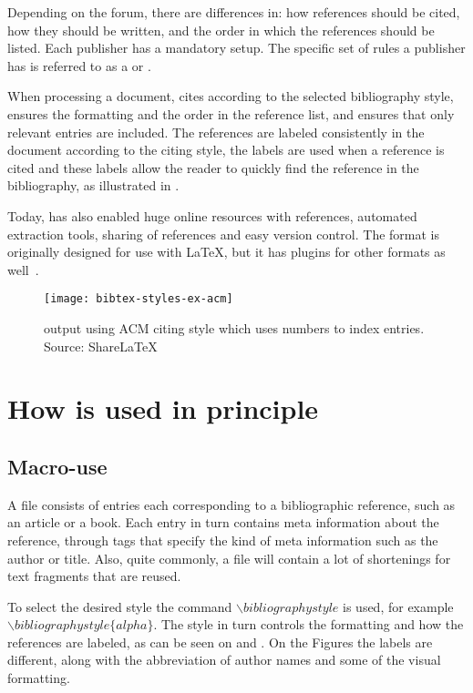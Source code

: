 Depending on the forum, there are differences in: how references
should be cited, how they should be written, and the order in which
the references should be listed.  Each publisher has a mandatory
setup.  The specific set of rules a publisher has is referred to as a
 or .

When processing a document, {\bibtex} cites according to the selected
bibliography style, ensures the formatting and the order in the
reference list, and ensures that only relevant entries are included.
The references are labeled consistently in the document according to
the citing style, the labels are used when a reference is cited and
these labels allow the reader to quickly find the reference in the
bibliography, as illustrated in .

Today, {\bibtex} has also enabled huge online resources with
references, automated extraction tools, sharing of references and easy
version control.  The {\bibtex} format is originally designed for use
with {\LaTeX}, but it has plugins for other formats as
well~\cite{bibtex_resource}.

\begin{figure}
  \centering
  \texttt{[image: bibtex-styles-ex-acm]}
  \caption{{\bibtex} output using ACM citing style which uses numbers to
    index entries.  Source: ShareLaTeX~\cite{sharelatex2016_styles}}
\label{fig:bibtex_example_acm}
\end{figure}

\section{How {\bibtex} is used in principle}
\label{sec:practice_of_bibtex}

\subsection{Macro-use}

A {\bibtex} file consists of entries each corresponding to a
bibliographic reference, such as an article or a book.  Each entry in
turn contains meta information about the reference, through tags that
specify the kind of meta information such as the author or title.
Also, quite commonly, a file will contain a lot of shortenings for
text fragments that are reused.

To select the desired style the command
${\backslash}bibliographystyle$ is used, for example
${\backslash}bibliographystyle\{alpha\}$.  The style in turn controls
the formatting and how the references are labeled, as can be seen on
 and .
On the Figures the labels are different, along with the abbreviation
of author names and some of the visual formatting.


